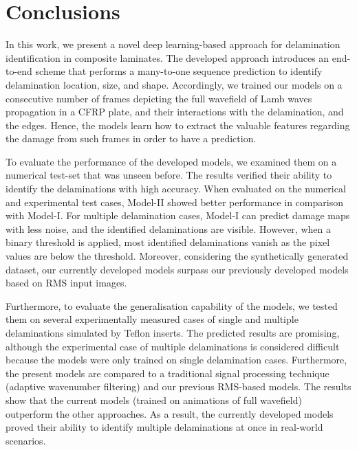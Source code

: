 \section{Conclusions}
\label{conclusion}
\begin{sloppypar}
	In this work, we present a novel deep learning-based approach for delamination identification in composite laminates.
	The developed approach introduces an end-to-end scheme that performs a many-to-one sequence prediction to identify delamination location, size, and shape.
	Accordingly, we trained our models on a consecutive number of frames depicting the full wavefield of Lamb waves propagation in a CFRP plate, and their interactions with the delamination, and the edges.
	Hence, the models learn how to extract the valuable features regarding the damage from such frames in order to have a prediction.

	To evaluate the performance of the developed models, we examined them on a numerical test-set that was unseen before.
	The results verified their ability to identify the delaminations with high accuracy. 
	When evaluated on the numerical and experimental test cases, Model-II showed better performance in comparison with Model-I.
	For multiple delamination cases, Model-I can predict damage maps with less noise, and the identified delaminations are visible.
	However, when a binary threshold is applied, most identified delaminations vanish as the pixel values are below the threshold.
	Moreover, considering the synthetically generated dataset, our currently developed models surpass our previously developed models based on RMS input images.

	Furthermore, to evaluate the generalisation capability of the models, we tested them on several experimentally measured cases of single and multiple delaminations simulated by Teflon inserts.
	The predicted results are promising, although the experimental case of multiple delaminations is considered difficult because the models were only trained on single delamination cases. 
	Furthermore, the present models are compared to a traditional signal processing technique (adaptive wavenumber filtering) and our previous RMS-based models. 
	The results show that the current models (trained on animations of full wavefield) outperform the other approaches.
	As a result, the currently developed models proved their ability to identify multiple delaminations at once in real-world scenarios.


\end{sloppypar}
